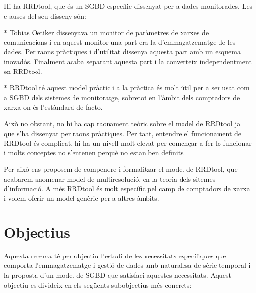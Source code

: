 Hi ha RRDtool, que és un SGBD específic dissenyat per a dades monitorades. Les c
auses del seu disseny són:

* Tobias Oetiker dissenyava un monitor de paràmetres de xarxes de comunicacions i en aquest monitor una part era la d'emmagatzematge de les dades. Per raons pràctiques i d'utilitat dissenya aquesta part amb un esquema inovadós. Finalment acaba separant aquesta part i la converteix independentment en RRDtool.

* RRDtool té aquest model pràctic i a la pràctica és molt útil per a ser usat com a SGBD dels sistemes de monitoratge, sobretot en l'àmbit dels comptadors de xarxa on és l'estàndard de facto. 

Això no obstant, no hi ha cap raonament teòric sobre el model de RRDtool ja que s'ha dissenyat per raons pràctiques. Per tant, entendre el funcionament de RRDtool és complicat, hi ha un nivell molt elevat per començar a fer-lo funcionar i molts conceptes no s'entenen perquè no estan ben definits. 

Per això ens proposem de compendre i formalitzar el model de RRDtool, que acabarem anomenar model de multiresolució, en la teoria dels sitemes d'informació. A més RRDtool és molt específic pel camp de comptadors de xarxa i volem oferir un model genèric per a altres àmbits.  













\section{Objectius}



Aquesta recerca té per objectiu l'estudi de les necessitats
específiques que comporta l'emmagatzematge i gestió de dades amb
naturalesa de sèrie temporal i la proposta d'un model de SGBD que
satisfaci aquestes necessitats. Aquest objectiu es divideix en els
següents subobjectius més concrets:

